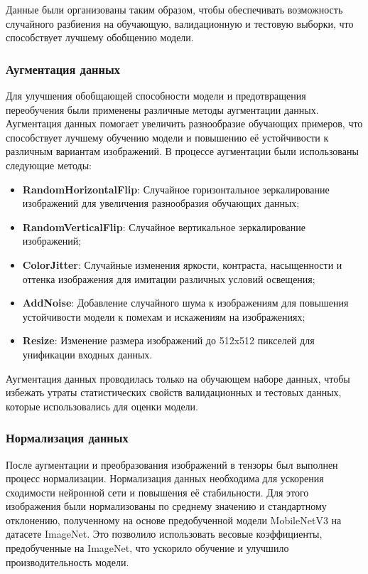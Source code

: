 {    Данные были организованы таким образом, чтобы обеспечивать возможность случайного разбиения на обучающую, валидационную и тестовую выборки, что способствует лучшему обобщению модели.

    \subsubsection*{Аугментация данных}

    Для улучшения обобщающей способности модели и предотвращения переобучения были применены различные методы аугментации данных. Аугментация данных помогает увеличить разнообразие обучающих примеров, что способствует лучшему обучению модели и повышению её устойчивости к различным вариантам изображений. В процессе аугментации были использованы следующие методы:
    \begin{itemize}
        \item \textbf{RandomHorizontalFlip}: Случайное горизонтальное зеркалирование изображений для увеличения разнообразия обучающих данных;
        \item \textbf{RandomVerticalFlip}: Случайное вертикальное зеркалирование изображений;
        \item \textbf{ColorJitter}: Случайные изменения яркости, контраста, насыщенности и оттенка изображения для имитации различных условий освещения;
        \item \textbf{AddNoise}: Добавление случайного шума к изображениям для повышения устойчивости модели к помехам и искажениям на изображениях;
        \item \textbf{Resize}: Изменение размера изображений до 512x512 пикселей для унификации входных данных.
    \end{itemize}

    Аугментация данных проводилась только на обучающем наборе данных, чтобы избежать утраты статистических свойств валидационных и тестовых данных, которые использовались для оценки модели.

    \subsubsection*{Нормализация данных}

    После аугментации и преобразования изображений в тензоры был выполнен процесс нормализации. Нормализация данных необходима для ускорения сходимости нейронной сети и повышения её стабильности. Для этого изображения были нормализованы по среднему значению и стандартному отклонению, полученному на основе предобученной модели MobileNetV3 на датасете ImageNet. Это позволило использовать весовые коэффициенты, предобученные на ImageNet, что ускорило обучение и улучшило производительность модели.
    
}
